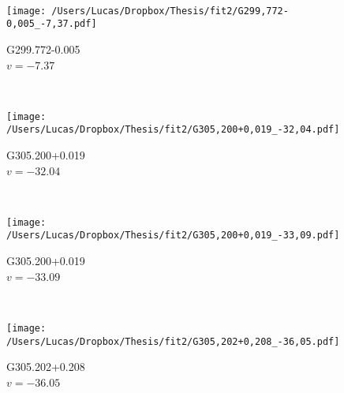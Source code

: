 \begin{figure*}[t]
\begin{subfigure}[t]{0.3\textwidth}
	\end{subfigure}
	~
	\begin{subfigure}[t]{0.3\textwidth}
		\texttt{[image: /Users/Lucas/Dropbox/Thesis/fit2/G299,772-0,005\_-7,37.pdf]}
		\caption[]{G299.772-0.005\\$v=-7.37$\,\kms}
	\end{subfigure}
	~
	\begin{subfigure}[t]{0.3\textwidth}
		\texttt{[image: /Users/Lucas/Dropbox/Thesis/fit2/G305,200+0,019\_-32,04.pdf]}
		\caption[]{G305.200+0.019\\$v=-32.04$\,\kms}
	\end{subfigure}
	~
	\begin{subfigure}[t]{0.3\textwidth}
		\texttt{[image: /Users/Lucas/Dropbox/Thesis/fit2/G305,200+0,019\_-33,09.pdf]}
		\caption[]{G305.200+0.019\\$v=-33.09$\,\kms}
	\end{subfigure}
	~
	\begin{subfigure}[t]{0.3\textwidth}
		\texttt{[image: /Users/Lucas/Dropbox/Thesis/fit2/G305,202+0,208\_-36,05.pdf]}
		\caption[]{G305.202+0.208\\$v=-36.05$\,\kms}
	\end{subfigure}
	~
\end{figure*}
\clearpage
